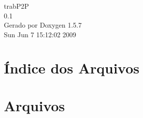 \documentclass[a4paper]{book}
\begin{document}
\begin{titlepage}
\vspace*{7cm}
\begin{center}
{\Large trabP2P \\[1ex]\large 0.1 }\\
\vspace*{1cm}
{\large Gerado por Doxygen 1.5.7}\\
\vspace*{0.5cm}
{\small Sun Jun 7 15:12:02 2009}\\
\end{center}
\end{titlepage}
\clearemptydoublepage
{}
\tableofcontents
\clearemptydoublepage
{}
\chapter{Índice dos Arquivos}

\chapter{Arquivos}








\printindex
\end{document}
